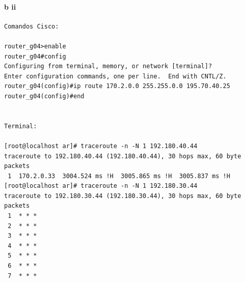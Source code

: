 \paragraph{b ii}
\begin{verbatim}
Comandos Cisco:                                                          
                                                                         
router_g04>enable                                                        
router_g04#config                                                        
Configuring from terminal, memory, or network [terminal]?                
Enter configuration commands, one per line.  End with CNTL/Z.            
router_g04(config)#ip route 170.2.0.0 255.255.0.0 195.70.40.25           
router_g04(config)#end                                                   
                                                                         
                                                                         
Terminal:                                                                
                                                                         
[root@localhost ar]# traceroute -n -N 1 192.180.40.44                    
traceroute to 192.180.40.44 (192.180.40.44), 30 hops max, 60 byte packets
 1  170.2.0.33  3004.524 ms !H  3005.865 ms !H  3005.837 ms !H           
[root@localhost ar]# traceroute -n -N 1 192.180.30.44                    
traceroute to 192.180.30.44 (192.180.30.44), 30 hops max, 60 byte packets
 1  * * *                                                                
 2  * * *                                                                
 3  * * *                                                                
 4  * * *                                                                
 5  * * *                                                                
 6  * * *                                                                
 7  * * *                                                                
\end{verbatim}
